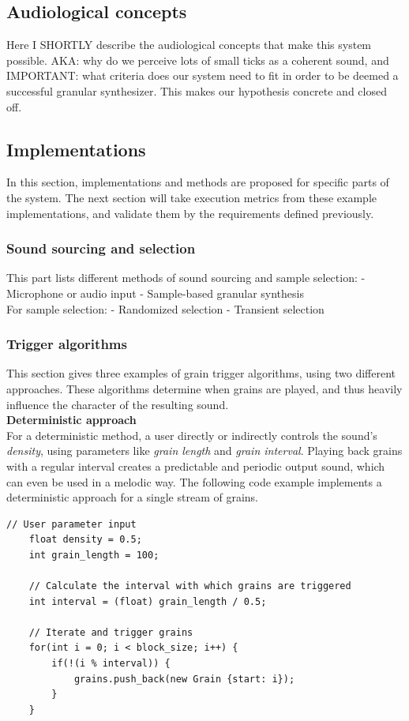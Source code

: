\documentclass[10pt, twocolumn]{IEEEtran}
\begin{document}
\subsection{Audiological concepts}
Here I SHORTLY describe the audiological concepts that make this system possible. AKA: why do we perceive lots of small ticks as a coherent sound, and IMPORTANT: what criteria does our system need to fit in order to be deemed a successful granular synthesizer. This makes our hypothesis concrete and closed off.

\subsection{Implementations}
In this section, implementations and methods are proposed for specific parts of the system. The next section will take execution metrics from these example implementations, and validate them by the requirements defined previously.

\subsubsection{Sound sourcing and selection}
This part lists different methods of sound sourcing and sample selection:
- Microphone or audio input
- Sample-based granular synthesis\\
For sample selection:
- Randomized selection
- Transient selection
\subsubsection{Trigger algorithms}
This section gives three examples of grain trigger algorithms, using two different approaches. These algorithms determine when grains are played, and thus heavily influence the character of the resulting sound.\\

\textbf{Deterministic approach}\\
For a deterministic method, a user directly or indirectly controls the sound's \textit{density}, using parameters like \textit{grain length} and \textit{grain interval}. Playing back grains with a regular interval creates a predictable and periodic output sound, which can even be used in a melodic way. The following code example implements a deterministic approach for a single stream of grains.
\begin{lstlisting}[caption={A deterministic method of grain "seeding"}]
	// User parameter input
	float density = 0.5;
	int grain_length = 100;
	
	// Calculate the interval with which grains are triggered
	int interval = (float) grain_length / 0.5;
	
	// Iterate and trigger grains
	for(int i = 0; i < block_size; i++) {
		if(!(i % interval)) {
			grains.push_back(new Grain {start: i});
		}
	}
\end{lstlisting}
\end{document}
